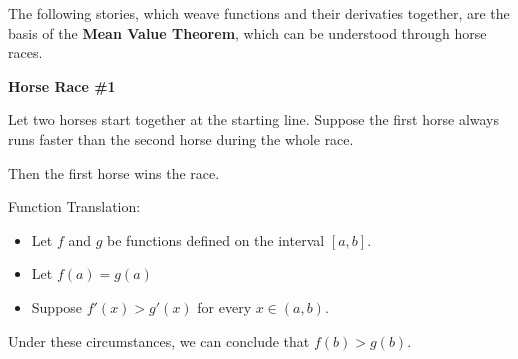 \documentclass{ximera}
\begin{document}
The following stories, which weave functions and their derivaties together, are the basis of the \textbf{Mean Value Theorem}, which can be understood through horse races. \\










\begin{idea} \textbf{\textcolor{blue!55!black}{Horse Race \#1}}   


Let two horses start together at the starting line. Suppose the first horse always runs faster than the second horse during the whole race.

Then the first horse wins the race.



\begin{model} Function Translation:

\begin{itemize}
\item Let $f$ and $g$ be functions defined on the interval $[a, b]$. 
\item Let $f(a) = g(a)$
\item Suppose $f'(x) > g'(x)$ for every $x \in (a,b)$. 
\end{itemize}

Under these circumstances, we can conclude that $f(b) > g(b)$.

\end{model} 




\end{idea}
\end{document}
